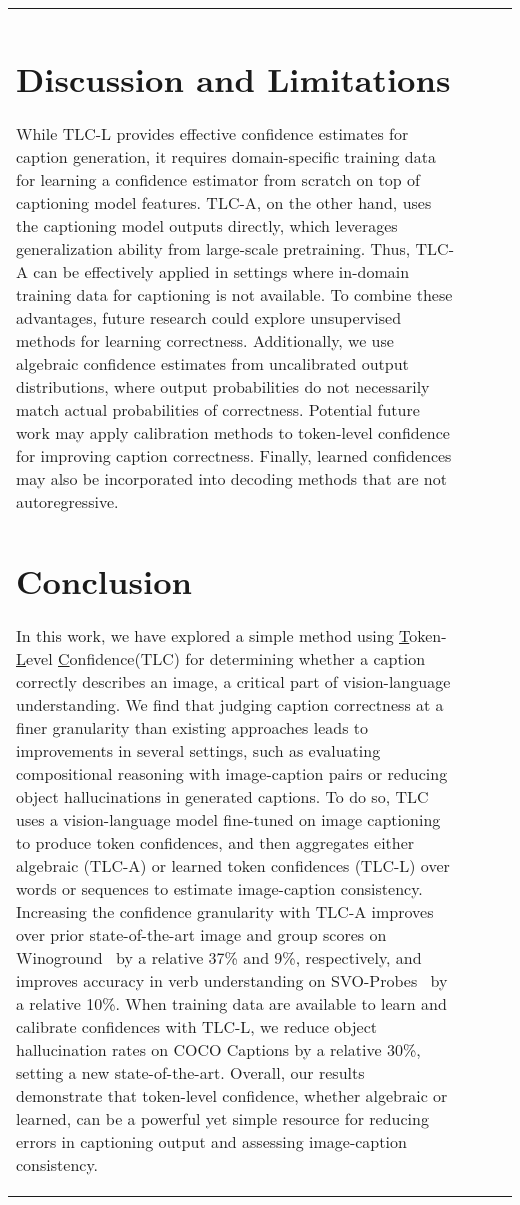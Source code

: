 \documentclass[10pt,twocolumn,letterpaper]{article}
\newcommand{\ApproachName}{TLC\xspace}
\newcommand{\ApproachNameLong}{\underline{T}oken-\underline{L}evel \underline{C}onfidence\xspace}
\begin{document}
\begin{table}
{\begin{tabular}{l@{}ccc}
\section{Discussion and Limitations}
\label{sec:limitations}

While \ApproachName-L provides effective confidence estimates for caption generation, it requires domain-specific training data for learning a confidence estimator from scratch on top of captioning model features. \ApproachName-A, on the other hand, uses the captioning model outputs directly, which leverages generalization ability from large-scale pretraining. Thus, \ApproachName-A can be effectively applied in settings where in-domain training data for captioning is not available. To combine these advantages, future research could explore unsupervised methods for learning correctness. Additionally, we use algebraic confidence estimates from uncalibrated output distributions, where output probabilities do not necessarily match actual probabilities of correctness. Potential future work may apply calibration methods to token-level confidence for improving caption correctness. Finally, learned confidences may also be incorporated into decoding methods that are not autoregressive.


\section{Conclusion}
\label{sec:conclusion}

In this work, we have explored a simple method using \ApproachNameLong (\ApproachName) for determining whether a caption correctly describes an image, a critical part of vision-language understanding. 
We find that judging caption correctness at a finer granularity than existing approaches leads to improvements in several settings, such as evaluating compositional reasoning with image-caption pairs or reducing object hallucinations in generated captions. To do so, \ApproachName uses a vision-language model fine-tuned on image captioning to produce token confidences, and then aggregates either algebraic (\ApproachName-A) or learned token confidences (\ApproachName-L) over words or sequences to estimate image-caption consistency. Increasing the confidence granularity with \ApproachName-A improves over prior state-of-the-art image and group scores on Winoground~\cite{thrush_and_ross2022winoground} by a relative 37\% and 9\%, respectively, and improves accuracy in verb understanding on SVO-Probes~\cite{hendricks2021probing} by a relative 10\%. When training data are available to learn and calibrate confidences with \ApproachName-L, we reduce object hallucination rates on COCO Captions by a relative 30\%, setting a new state-of-the-art. Overall, our results demonstrate that token-level confidence, whether algebraic or learned, can be a powerful yet simple resource for reducing errors in captioning output and assessing image-caption consistency.


\end{tabular}}
\end{table}
\end{document}
